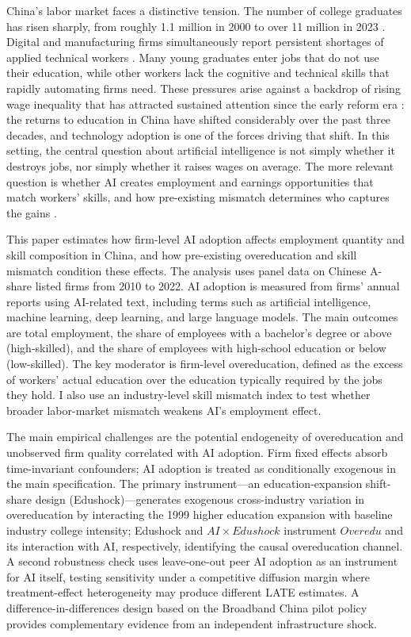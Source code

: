\documentclass[12pt,a4paper]{article}
\theoremstyle{predstyle}
\theoremstyle{plain}
\newcommand{\Overedu}{\mathit{Overedu}}
\begin{document}
China's labor market faces a distinctive tension. The number of college graduates has risen sharply, from roughly 1.1 million in 2000 to over 11 million in 2023 \citep{moe2024}. Digital and manufacturing firms simultaneously report persistent shortages of applied technical workers \citep{ilo2020skills}. Many young graduates enter jobs that do not use their education, while other workers lack the cognitive and technical skills that rapidly automating firms need. These pressures arise against a backdrop of rising wage inequality that has attracted sustained attention since the early reform era \citep{knight2003, knight2014}: the returns to education in China have shifted considerably over the past three decades, and technology adoption is one of the forces driving that shift. In this setting, the central question about artificial intelligence is not simply whether it destroys jobs, nor simply whether it raises wages on average. The more relevant question is whether AI creates employment and earnings opportunities that match workers' skills, and how pre-existing mismatch determines who captures the gains \citep{brynjolfsson2014second}.

This paper estimates how firm-level AI adoption affects employment quantity and skill composition in China, and how pre-existing overeducation and skill mismatch condition these effects. The analysis uses panel data on Chinese A-share listed firms from 2010 to 2022. AI adoption is measured from firms' annual reports using AI-related text, including terms such as artificial intelligence, machine learning, deep learning, and large language models. The main outcomes are total employment, the share of employees with a bachelor's degree or above (high-skilled), and the share of employees with high-school education or below (low-skilled). The key moderator is firm-level overeducation, defined as the excess of workers' actual education over the education typically required by the jobs they hold. I also use an industry-level skill mismatch index to test whether broader labor-market mismatch weakens AI's employment effect.

The main empirical challenges are the potential endogeneity of overeducation and unobserved firm quality correlated with AI adoption. Firm fixed effects absorb time-invariant confounders; AI adoption is treated as conditionally exogenous in the main specification. The primary instrument---an education-expansion shift-share design (Edushock)---generates exogenous cross-industry variation in overeducation by interacting the 1999 higher education expansion with baseline industry college intensity; Edushock and \(AI \times Edushock\) instrument \(\Overedu\) and its interaction with AI, respectively, identifying the causal overeducation channel. A second robustness check uses leave-one-out peer AI adoption as an instrument for AI itself, testing sensitivity under a competitive diffusion margin where treatment-effect heterogeneity may produce different LATE estimates. A difference-in-differences design based on the Broadband China pilot policy provides complementary evidence from an independent infrastructure shock.
\end{document}
